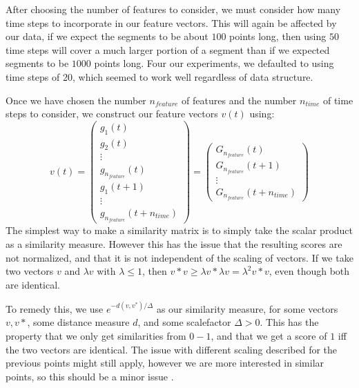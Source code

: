 After choosing the number of features to consider, we must consider how many time steps to incorporate in our feature vectors. This will again be affected  by our data, if we expect the segments to be about $100$ points long, then using $50$ time steps will cover a much larger portion of a segment than if we expected segments to be $1000$ points long.  Four our experiments, we defaulted to using time steps of  20, which seemed to work well regardless of data structure.

Once we have chosen the number $n_{feature}$ of features and the number $n_{time}$ of time steps to consider, we construct our feature vectors $v(t)$ using:
\[
v(t)= \left (
\begin{matrix}
g_1(t) \\
g_2(t) \\
\vdots \\
g_{n_{feature}}(t) \\
g_{1}(t+1) \\
\vdots \\
g_{n_{feature}}(t+n_{time})
\end{matrix}
\right ) = \left (
\begin{matrix}
G_{n_{feature}}(t) \\
G_{n_{feature}}(t+1) \\
\vdots \\
G_{n_{feature}}(t+n_{time})
\end{matrix}
\right )
\]
The simplest way to make a similarity matrix is to simply take the scalar product as a similarity measure. However this has the issue that the resulting scores are not normalized, and that it is not independent of the scaling of vectors. If we take two vectors $v$ and $\lambda v$ with $\lambda \leq 1$, then $v*v \geq \lambda v* \lambda v=\lambda^2 v*v$, even though both are identical. 

To remedy this, we use $e^{-d(v,v^*)/\Delta}$ as our similarity measure, for some vectors $v,v*$, some distance measure $d$, and some scalefactor $\Delta > 0$. This has the property that we only get similarities from $0-1$, and that we get a score of $1$ iff  the two vectors are identical. The issue with different scaling described for the previous points might still apply, however we are more interested in similar points, so this should be a minor issue .

